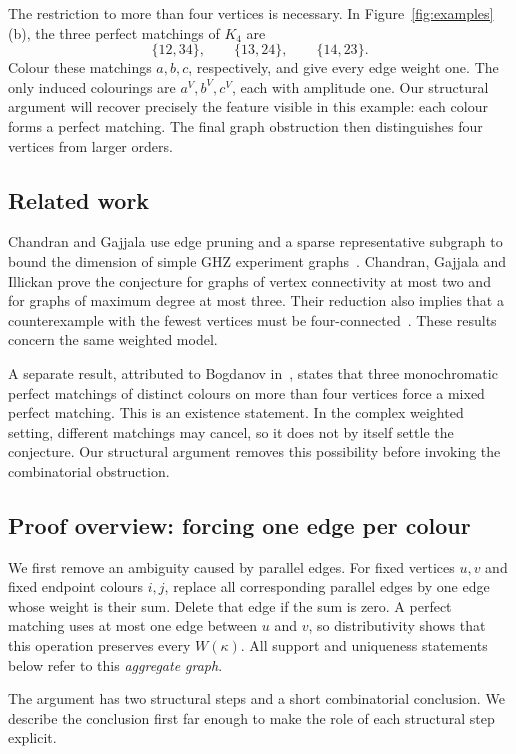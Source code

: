 \documentclass[11pt]{article}
\theoremstyle{definition}
\theoremstyle{plain}
\numberwithin{equation}{section}
\begin{document}
The restriction to more than four vertices is necessary. In
Figure~\ref{fig:examples}(b), the three perfect matchings of \(K_4\) are
\[
 \{12,34\},\qquad \{13,24\},\qquad \{14,23\}.
\]
Colour these matchings \(a,b,c\), respectively, and give every edge weight
one. The only induced colourings are \(a^V,b^V,c^V\), each with amplitude
one. Our structural argument will recover precisely the feature visible in
this example: each colour forms a perfect matching. The final graph
obstruction then distinguishes four vertices from larger orders.

\subsection{Related work}

Chandran and Gajjala use edge pruning and a sparse representative subgraph
to bound the dimension of simple GHZ experiment graphs~\cite{cg}.
Chandran, Gajjala and Illickan prove the conjecture for graphs of vertex
connectivity at most two and for graphs of maximum degree at most three.
Their reduction also implies that a counterexample with the fewest vertices
must be four-connected~\cite[Theorems~9--11]{cgi}. These results concern the
same weighted model.

A separate result, attributed to Bogdanov in~\cite[Theorem~7]{cgi}, states
that three monochromatic perfect matchings of distinct colours on more than
four vertices force a mixed perfect matching. This is an existence statement.
In the complex weighted setting, different matchings may cancel, so it does
not by itself settle the conjecture. Our structural argument removes this
possibility before invoking the combinatorial obstruction.

\subsection{Proof overview: forcing one edge per colour}\label{sec:overview}

We first remove an ambiguity caused by parallel edges. For fixed vertices
\(u,v\) and fixed endpoint colours \(i,j\), replace all corresponding
parallel edges by one edge whose weight is their sum. Delete that edge if
the sum is zero. A perfect matching uses at most one edge between \(u\) and
\(v\), so distributivity shows that this operation preserves every
\(W(\kappa)\). All support and uniqueness statements below refer to this
\emph{aggregate graph}.

The argument has two structural steps and a short combinatorial conclusion.
We describe the conclusion first far enough to make the role of each
structural step explicit.
\end{document}
